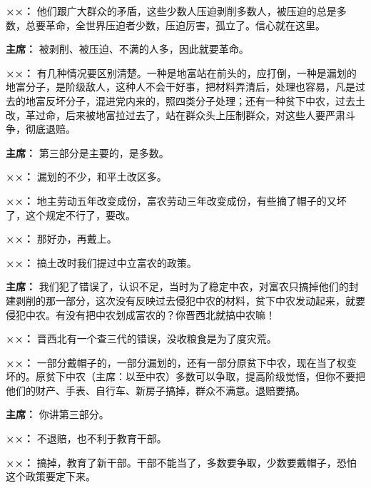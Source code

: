 \begin{list}{}
\item[\textbf{××：}] 他们跟广大群众的矛盾，这些少数人压迫剥削多数人，被压迫的总是多数，总要革命，全世界压迫者少数，压迫厉害，孤立了。信心就在这里。

\item[\textbf{主席：}] 被剥削、被压迫、不满的人多，因此就要革命。

\item[\textbf{××：}] 有几种情况要区别清楚。一种是地富站在前头的，应打倒，一种是漏划的地富分子，是阶级敌人，这种人不会干好事，把材料弄清后，处理也容易，凡是过去的地富反坏分子，混进党内来的，照四类分子处理；还有一种贫下中农，过去土改，革过命，后来被地富拉过去了，站在群众头上压制群众，对这些人要严肃斗争，彻底退赔。

\item[\textbf{主席：}] 第三部分是主要的，是多数。

\item[\textbf{××：}] 漏划的不少，和平土改区多。

\item[\textbf{××：}] 地主劳动五年改变成份，富农劳动三年改变成份，有些摘了帽子的又坏了，这个规定不行了，要改。

\item[\textbf{××：}] 那好办，再戴上。

\item[\textbf{××：}] 搞土改时我们提过中立富农的政策。

\item[\textbf{主席：}] 我们犯了错误了，认识不足，当时为了稳定中农，对富农只搞掉他们的封建剥削的那一部分，这次没有反映过去侵犯中农的材料，贫下中农发动起来，就要侵犯中农。有没有把中农划成富农的？你晋西北就搞中农嘛！

\item[\textbf{××：}] 晋西北有一个查三代的错误，没收粮食是为了度灾荒。

\item[\textbf{××：}] 一部分戴帽子的，一部分漏划的，还有一部分原贫下中农，现在当了权变坏的。原贫下中农（主席：以至中农）多数可以争取，提高阶级觉悟，但你不要把他们的财产、手表、自行车、新房子搞掉，群众不满意。退赔要搞。

\item[\textbf{主席：}] 你讲第三部分。

\item[\textbf{××：}] 不退赔，也不利于教育干部。

\item[\textbf{××：}] 搞掉，教育了新干部。干部不能当了，多数要争取，少数要戴帽子，恐怕这个政策要定下来。


\end{list}

